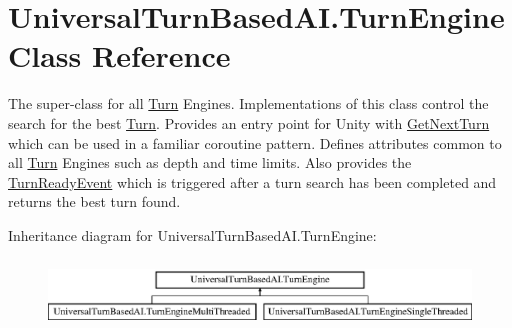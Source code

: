\hypertarget{class_universal_turn_based_a_i_1_1_turn_engine}{}\section{Universal\+Turn\+Based\+A\+I.\+Turn\+Engine Class Reference}
\label{class_universal_turn_based_a_i_1_1_turn_engine}


The super-\/class for all \hyperlink{class_universal_turn_based_a_i_1_1_turn}{Turn} Engines. Implementations of this class control the search for the best \hyperlink{class_universal_turn_based_a_i_1_1_turn}{Turn}. Provides an entry point for Unity with \hyperlink{class_universal_turn_based_a_i_1_1_turn_engine_ae2a5b877b8194f05dc970226722515ee}{Get\+Next\+Turn} which can be used in a familiar coroutine pattern. Defines attributes common to all \hyperlink{class_universal_turn_based_a_i_1_1_turn}{Turn} Engines such as depth and time limits. Also provides the \hyperlink{class_universal_turn_based_a_i_1_1_turn_engine_af10115494121382d2966a8fc9fe4c9a0}{Turn\+Ready\+Event} which is triggered after a turn search has been completed and returns the best turn found.  


Inheritance diagram for Universal\+Turn\+Based\+A\+I.\+Turn\+Engine\+:\begin{figure}[H]
\begin{center}
\leavevmode
\includegraphics[height=1.842105cm]{class_universal_turn_based_a_i_1_1_turn_engine}
\end{center}
\end{figure}
